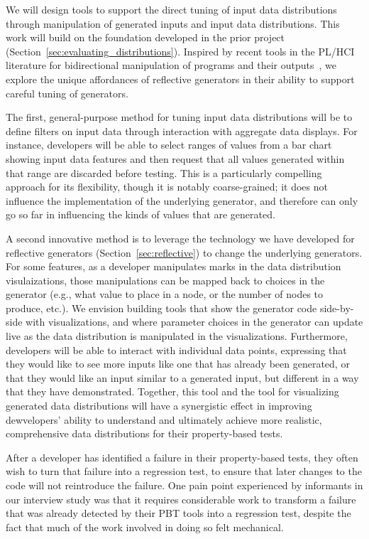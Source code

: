 We will design tools to support the direct tuning of input data distributions
through manipulation of generated inputs and input data distributions. This
work will build on the foundation developed in the prior project
(Section~\ref{sec:evaluating_distributions}). Inspired by recent tools in the PL/HCI literature
for bidirectional manipulation of programs and their
outputs~\cite{ref:hempel2019sketch,ref:kery2020mage,ref:omar2012active,ref:omar2021filling},
we explore the unique affordances of reflective generators in their ability to
support careful tuning of generators.

The first, general-purpose method for tuning input data distributions will be to
define filters on input data through interaction with aggregate data displays.
For instance, developers will be able to select ranges of values from a bar
chart showing input data features and then request that all values generated
within that range are discarded before testing. This is a particularly
compelling approach for its flexibility, though it is notably coarse-grained;
it does not influence the implementation of the underlying generator, and
therefore can only go so far in influencing the kinds of values that are
generated.

A second innovative method is to leverage the technology we have developed for
reflective generators (Section~\ref{sec:reflective}) to change the underlying
generators. For some features, as a developer manipulates marks in the data
distribution visulaizations, those manipulations can be mapped back to choices
in the generator (e.g., what value to place in a node, or the number of nodes to
produce, etc.). We envision building tools that show the generator code
side-by-side with visualizations, and where parameter choices in the generator
can update live as the data distribution is manipulated in the visualizations.
Furthermore, developers will be able to interact with individual data points,
expressing that they would like to see more inputs like one that has already
been generated, or that they would like an input similar to a generated input,
but different in a way that they have demonstrated. Together, this tool and the
tool for visualizing generated data distributions will have a synergistic effect
in improving dewvelopers' ability to understand and ultimately achieve more
realistic, comprehensive data distributions for their property-based tests.

%
After a developer has identified a failure in their property-based tests, they
often wish to turn that failure into a regression test, to ensure that later
changes to the code will not reintroduce the failure. One pain point experienced
by informants in our interview study was that it requires considerable work to
transform a failure that was already detected by their PBT tools into a
regression test, despite the fact that much of the work involved in doing so
felt mechanical.

